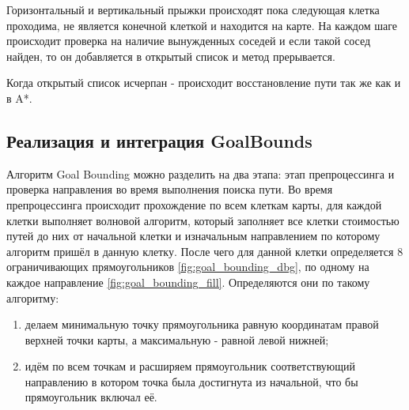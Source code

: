 {
	\mybox[x=1,y=1,color=grey]
	\mybox[x=1,y=2,color=grey]
	\mybox[x=1,y=3,color=grey]
	\mybox[x=2,y=1,color=grey]
	\mybox[x=3,y=1,color=grey]
	\mybox[x=3,y=1,color=grey]
	\mybox[x=2,y=3,color=black]
	\mybox[x=3,y=2,color=black]
	\mybox[x=2,y=2,color=green]
	
	\mygrid[width=5, height=5]
	
	\myarrow[startx=0,starty=0,endx=1,endy=1,color=darkgrey]
	\myarrow[startx=1,starty=1,endx=1,endy=2,color=darkgrey]
	\myarrow[startx=1,starty=2,endx=1,endy=3,color=darkgrey]
	\myarrow[startx=1,starty=1,endx=2,endy=1,color=darkgrey]
	\myarrow[startx=2,starty=1,endx=3,endy=1,color=darkgrey]
	\myarrow[startx=1,starty=1,endx=2,endy=2,color=darkgrey]
	\myarrow[startx=2,starty=2,endx=2,endy=3,color=red]
	\myarrow[startx=2,starty=2,endx=3,endy=2,color=red]
	\myarrow[startx=2,starty=2,endx=3,endy=3,color=red]
}
  
Горизонтальный и вертикальный прыжки происходят пока следующая клетка проходима, не является конечной клеткой и находится на карте. На каждом шаге происходит проверка на наличие вынужденных соседей и если такой сосед найден, то он добавляется в открытый список и метод прерывается. 

Когда открытый список исчерпан - происходит восстановление пути так же как и в A*.

\subsection{Реализация и интеграция GoalBounds}

Алгоритм Goal Bounding можно разделить на два этапа: этап препроцессинга и проверка направления во время выполнения поиска пути. Во время препроцессинга происходит прохождение по всем клеткам карты, для каждой клетки выполняет волновой алгоритм, который заполняет все клетки стоимостью путей до них от начальной клетки и изначальным направлением по которому алгоритм пришёл в данную клетку. После чего для данной клетки определяется 8 ограничивающих прямоугольников \cref{fig:goal_bounding_dbg}, по одному на каждое направление \cref{fig:goal_bounding_fill}. Определяются они по такому алгоритму: 

\begin{enumerate}
	\item делаем минимальную точку прямоугольника равную координатам правой верхней точки карты, а максимальную - равной левой нижней;
	\item идём по всем точкам и расширяем прямоугольник соответствующий направлению в котором точка была достигнута из начальной, что бы прямоугольник включал её. 
\end{enumerate}


